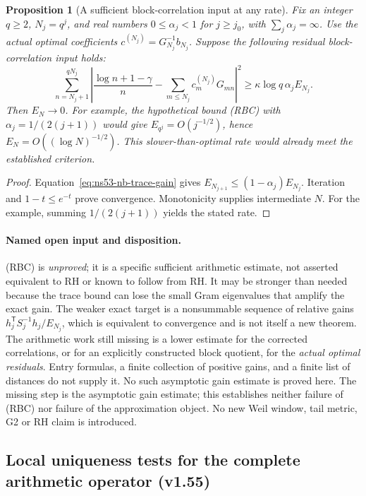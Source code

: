 \documentclass[11pt]{article}
\newtheorem{proposition}[theorem]{Proposition}
\theoremstyle{remark}
\begin{document}
\begin{proposition}[A sufficient block-correlation input at any rate]
\label{prop:ns53-nb-any-rate}
Fix an integer $q\geq2$, $N_j=q^j$, and real numbers
$0\leq\alpha_j<1$ for $j\geq j_0$, with $\sum_j\alpha_j=\infty$.
Use the actual optimal coefficients $c^{(N_j)}=G_{N_j}^{-1}b_{N_j}$.
Suppose the following \emph{residual block-correlation input} holds:
\begin{equation*}
 \sum_{n=N_j+1}^{qN_j}
 \left|\frac{\log n+1-\gamma}{n}
       -\sum_{m\leq N_j}c_m^{(N_j)}G_{mn}\right|^2
 \geq\kappa\log q\,\alpha_j E_{N_j}.
 \tag{RBC}\label{eq:ns53-nb-rbc}
\end{equation*}
Then $E_N\to0$. For example, the hypothetical bound (RBC) with
$\alpha_j=1/(2(j+1))$ would give
$E_{q^j}=O(j^{-1/2})$, hence $E_N=O((\log N)^{-1/2})$.
This slower-than-optimal rate would already meet the established criterion.
\end{proposition}

\begin{proof}
Equation~\eqref{eq:ns53-nb-trace-gain} gives
$E_{N_{j+1}}\leq(1-\alpha_j)E_{N_j}$. Iteration and
$1-t\leq e^{-t}$ prove convergence. Monotonicity supplies intermediate
$N$. For the example, summing $1/(2(j+1))$ yields the stated rate.
\end{proof}

\paragraph{Named open input and disposition.}
(RBC) is \emph{unproved}; it is a specific sufficient arithmetic estimate,
not asserted equivalent to RH or known to follow from RH. It may be
stronger than needed because the trace bound can lose the small
Gram eigenvalues that amplify the exact gain. The weaker exact target is
a nonsummable sequence of relative gains
$h_j^{\mathsf T}S_j^{-1}h_j/E_{N_j}$, which is equivalent to convergence
and is not itself a new theorem. The arithmetic work still missing is
a lower estimate for the corrected correlations, or for an explicitly
constructed block quotient, for the \emph{actual optimal residuals}.
Entry formulas, a finite collection of positive gains, and a finite list of distances
do not supply it. No such asymptotic gain estimate is proved here.
The missing step is the asymptotic gain estimate; this establishes
neither failure of (RBC) nor failure of the approximation object. No new Weil window, tail metric, G2 or RH
claim is introduced.

\subsection{Local uniqueness tests for the complete arithmetic operator (v1.55)}
\label{sec:v155-local-uniqueness}
\end{document}
